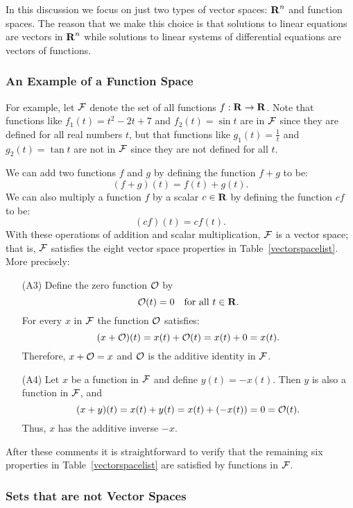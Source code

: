 In this discussion we focus on just two types of vector spaces:
$\mbox{$\bf{R}$}^n$ and function spaces.  The reason that we make this choice
is that solutions to linear equations are vectors in $\mbox{$\bf{R}$}^n$ while
solutions to linear systems of differential equations are vectors
of functions.

\subsubsection*{An Example of a Function Space}

For example, let ${\cal F}$ denote the set of all functions $f:\mbox{$\bf{R}$}\to\mbox{$\bf{R}$}$.
Note that functions like $f_1(t)=t^2-2t+7$ and $f_2(t)=\sin t$ are in
${\cal F}$ since they are defined for all real numbers $t$, but that functions
like $g_1(t)=\frac{1}{t}$ and $g_2(t)=\tan t$ are not in ${\cal F}$ since
they are not defined for all $t$.

We can add two functions $f$ and $g$ by defining the function $f+g$ to be:
\[
(f+g)(t) = f(t) + g(t).
\]
We can also multiply a function $f$ by a scalar $c\in\mbox{$\bf{R}$}$ by defining the
function $cf$ to be:
\[
(cf)(t) = cf(t).
\]
With these operations of addition and scalar multiplication, ${\cal F}$
is a vector space; that is, ${\cal F}$ satisfies the eight vector space
properties in Table~\ref{vectorspacelist}.  More precisely:
\begin{itemize}
\item[(A3)] Define the zero function ${\cal O}$ by
\[
     {\cal O}(t) = 0 \quad \mbox{for all $t\in\mbox{$\bf{R}$}$.}
\]
For every $x$ in ${\cal F}$ the function ${\cal O}$ satisfies:
\[
     (x+{\cal O})(t) = x(t) + {\cal O}(t) = x(t) + 0 = x(t).
\]
Therefore, $x+{\cal O}=x$ and ${\cal O}$ is the additive
identity in ${\cal F}$.
\item[(A4)] Let $x$ be a function in ${\cal F}$ and define $y(t)=-x(t)$.
Then $y$ is also a function in ${\cal F}$, and
\[
    (x+y)(t) =  x(t) + y(t) = x(t) + (-x(t)) = 0 = {\cal O}(t).
\]
Thus, $x$ has the additive inverse $-x$.
\end{itemize}
After these comments it is straightforward to verify that the
remaining six properties in Table~\ref{vectorspacelist} are
satisfied by functions in ${\cal F}$.

\subsubsection*{Sets that are not Vector Spaces}

